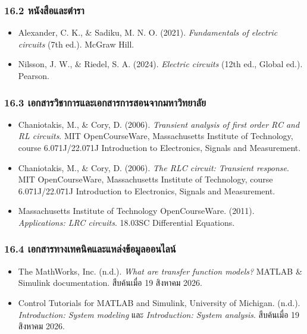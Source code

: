 \subsubsection{16.2 หนังสือและตำรา}

\begin{itemize}
    \item Alexander, C. K., \& Sadiku, M. N. O. (2021). \textit{Fundamentals of electric circuits} (7th ed.). McGraw Hill.
    \item Nilsson, J. W., \& Riedel, S. A. (2024). \textit{Electric circuits} (12th ed., Global ed.). Pearson.
\end{itemize}

\subsubsection{16.3 เอกสารวิชาการและเอกสารการสอนจากมหาวิทยาลัย}

\begin{itemize}
    \item Chaniotakis, M., \& Cory, D. (2006). \textit{Transient analysis of first order RC and RL circuits}. MIT OpenCourseWare, Massachusetts Institute of Technology, course 6.071J/22.071J Introduction to Electronics, Signals and Measurement.
    \item Chaniotakis, M., \& Cory, D. (2006). \textit{The RLC circuit: Transient response}. MIT OpenCourseWare, Massachusetts Institute of Technology, course 6.071J/22.071J Introduction to Electronics, Signals and Measurement.
    \item Massachusetts Institute of Technology OpenCourseWare. (2011). \textit{Applications: LRC circuits}. 18.03SC Differential Equations.
\end{itemize}

\subsubsection{16.4 เอกสารทางเทคนิคและแหล่งข้อมูลออนไลน์}

\begin{itemize}
    \item The MathWorks, Inc. (n.d.). \textit{What are transfer function models?} MATLAB \& Simulink documentation. สืบค้นเมื่อ 19 สิงหาคม 2026.
    \item Control Tutorials for MATLAB and Simulink, University of Michigan. (n.d.). \textit{Introduction: System modeling} และ \textit{Introduction: System analysis}. สืบค้นเมื่อ 19 สิงหาคม 2026.
\end{itemize}

